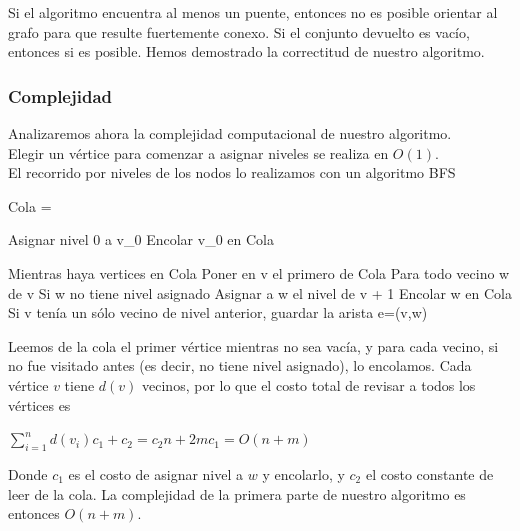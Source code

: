 Si el algoritmo encuentra al menos un puente, entonces no es posible orientar al grafo para que resulte fuertemente conexo. Si el conjunto devuelto es vacío, entonces si es posible. Hemos demostrado 
la correctitud de nuestro algoritmo. \\

\subsubsection{Complejidad}
Analizaremos ahora la complejidad computacional de nuestro algoritmo.\\

Elegir un vértice para comenzar a asignar niveles se realiza en $O(1)$. \\
El recorrido por niveles de los nodos lo realizamos con un algoritmo BFS

\begin{verbatimtab}
Cola 	= {}

Asignar nivel 0 a v_0
Encolar v_0 en Cola

Mientras haya vertices en Cola
{
    Poner en v el primero de Cola
    Para todo vecino w de v
    {
	Si w no tiene nivel asignado
	{
	    Asignar a w el nivel de v + 1
	    Encolar w en Cola
	}
    }
    Si v tenía un sólo vecino de nivel anterior, guardar la arista e=(v,w)
}
\end{verbatimtab}

Leemos de la cola el primer vértice mientras no sea vacía, y para cada vecino, si no fue visitado antes (es decir, no tiene nivel asignado), lo encolamos. Cada vértice $v$ tiene $d(v)$ vecinos, por lo que el costo 
total de revisar a todos los vértices es 
\begin{center}
 $\sum_{i=1}^{n} d(v_i)c_1 + c_2 = c_2n + 2mc_1 = O(n+m)$
\end{center}
Donde $c_1$ es el costo de asignar nivel a $w$ y encolarlo, y $c_2$ el costo constante de leer de la cola. La complejidad de la primera parte de nuestro algoritmo es entonces $O(n+m)$.\\

